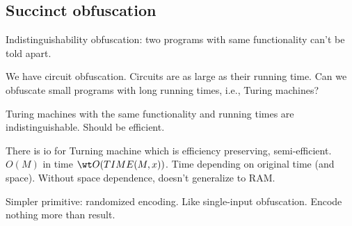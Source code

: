 \subsection{Succinct obfuscation}

Indistinguishability obfuscation: two programs with same functionality can't be told apart.

We have circuit obfuscation. Circuits are as large as their running time. Can we obfuscate small programs with long running times, i.e., Turing machines?

Turing machines with the same functionality and running times are indistinguishable. Should be efficient. 

There is io for Turning machine which is efficiency preserving, semi-efficient.
$O(M)$ in time $\wt O(TIME(M,x))$. 
Time depending on original time (and space). Without space dependence, doesn't generalize to RAM.

Simpler primitive: randomized encoding. Like single-input obfuscation. Encode nothing more than result. 

